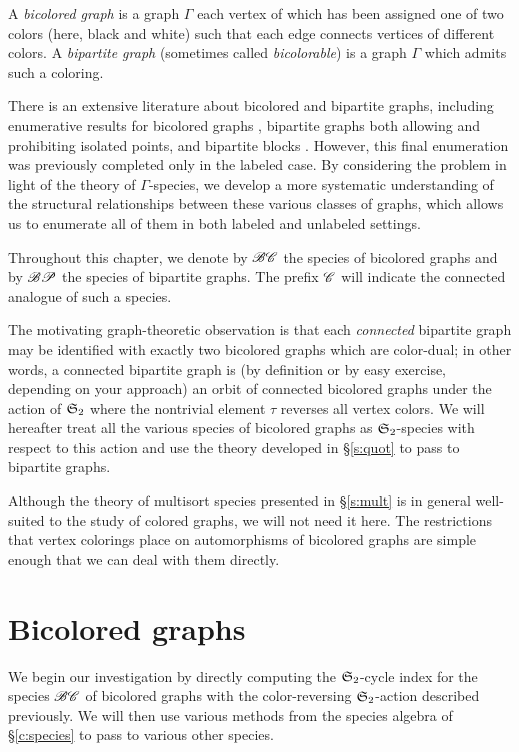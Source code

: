 \documentclass[distribution,draft]{brandiss} %
\numberwithin{section}{chapter}
\numberwithin{figure}{chapter}
\begin{document}
\begin{definition}
  \label{def:bcgraph}
  A \emph{bicolored graph} is a graph $\Gamma$ each vertex of which has been assigned one of two colors (here, black and white) such that each edge connects vertices of different colors.
  A \emph{bipartite graph} (sometimes called \emph{bicolorable}) is a graph $\Gamma$ which admits such a coloring.  
\end{definition}

There is an extensive literature about bicolored and bipartite graphs, including enumerative results for bicolored graphs \cite{har:bicolored}, bipartite graphs both allowing \cite{han:bipartite} and prohibiting \cite{harprins:bipartite} isolated points, and bipartite blocks \cite{harrob:bipblocks}.
However, this final enumeration was previously completed only in the labeled case.
By considering the problem in light of the theory of $\Gamma$-species, we develop a more systematic understanding of the structural relationships between these various classes of graphs, which allows us to enumerate all of them in both labeled and unlabeled settings.

Throughout this chapter, we denote by $\mathscr{BC}$ the species of bicolored graphs and by $\mathscr{BP}$ the species of bipartite graphs.
The prefix $\mathscr{C}$ will indicate the connected analogue of such a species.

The motivating graph-theoretic observation is that each \emph{connected} bipartite graph may be identified with exactly two bicolored graphs which are color-dual; in other words, a connected bipartite graph is (by definition or by easy exercise, depending on your approach) an orbit of connected bicolored graphs under the action of $ \mathfrak{S}_{2} $ where the nontrivial element $\tau$ reverses all vertex colors.
We will hereafter treat all the various species of bicolored graphs as $ \mathfrak{S}_{2} $-species with respect to this action and use the theory developed in \S \ref{s:quot} to pass to bipartite graphs.

Although the theory of multisort species presented in \S \ref{s:mult} is in general well-suited to the study of colored graphs, we will not need it here.
The restrictions that vertex colorings place on automorphisms of bicolored graphs are simple enough that we can deal with them directly.

\section{Bicolored graphs}\label{s:bcgraph}
We begin our investigation by directly computing the $ \mathfrak{S}_{2} $-cycle index for the species $\mathscr{BC}$ of bicolored graphs with the color-reversing $ \mathfrak{S}_{2} $-action described previously.
We will then use various methods from the species algebra of \S \ref{c:species} to pass to various other species.
\end{document}
